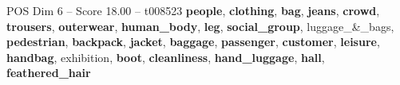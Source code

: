 \begin{textsample}{POS Dim 6 – Score 18.00 – t008523}  \label{ex:f6_pos_007}
\textbf{people}, \textbf{clothing}, \textbf{bag}, \textbf{jeans}, \textbf{crowd}, \textbf{trousers}, \textbf{outerwear}, \textbf{human\_body}, \textbf{leg}, \textbf{social\_group}, luggage\_\&\_bags, \textbf{pedestrian}, \textbf{backpack}, \textbf{jacket}, \textbf{baggage}, \textbf{passenger}, \textbf{customer}, \textbf{leisure}, \textbf{handbag}, exhibition, \textbf{boot}, \textbf{cleanliness}, \textbf{hand\_luggage}, \textbf{hall}, \textbf{feathered\_hair}

\end{textsample}
